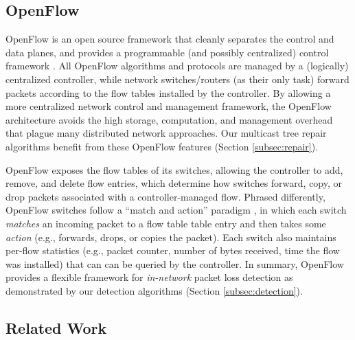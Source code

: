\subsection{OpenFlow}
\label{subsec:openflow}

OpenFlow is an open source framework that cleanly separates the control and data planes, and provides a programmable (and possibly centralized) control framework \cite{OpenFlow08}.
All OpenFlow algorithms and protocols are managed by a (logically) centralized controller, 
while network switches/routers (as their only task) forward packets according to the flow tables installed by the controller. 
By allowing a more centralized network control and management framework, the OpenFlow architecture avoids the high storage, computation, and management overhead that plague many distributed network approaches.
Our multicast tree repair algorithms benefit from these OpenFlow features (Section \ref{subsec:repair}).

OpenFlow exposes the flow tables of its switches, allowing the controller to add, remove, and delete flow entries, which determine how switches 
forward, copy, or drop packets associated with a controller-managed flow. 
Phrased differently, OpenFlow switches follow a ``match and action'' paradigm \cite{OpenFlow08}, in which each switch \emph{matches} an incoming packet 
to a flow table table entry and then takes some \emph{action} (e.g., forwards, drops, or copies the packet).
Each switch also maintains per-flow statistics (e.g., packet counter, number of bytes received, time the flow was installed) that can 
can be queried by the controller.  In summary, OpenFlow provides a flexible framework for \emph{in-network} packet loss detection as 
demonstrated by our detection algorithms (Section \ref{subsec:detection}).


\subsection{Related Work}
\label{subsec:related}

